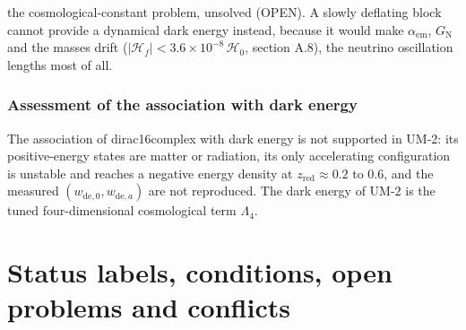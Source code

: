 \documentclass[
  10pt,
]{article}
\begin{document}
the cosmological-constant problem, unsolved (OPEN). A slowly deflating
block cannot provide a dynamical dark energy instead, because it would
make \(\alpha_{\mathrm{em}}\), \(G_{\mathrm{N}}\) and the masses drift
(\(\lvert\mathcal{H}_f\rvert < 3.6\times10^{-8}\,\mathcal{H}_0\),
section A.8), the neutrino oscillation lengths most of all.

\hypertarget{assessment-of-the-association-with-dark-energy}{%
\subsubsection*{Assessment of the association with dark
energy}\label{assessment-of-the-association-with-dark-energy}}

The association of dirac16complex with dark energy is not supported in
UM-2: its positive-energy states are matter or radiation, its only
accelerating configuration is unstable and reaches a negative energy
density at \(z_{\mathrm{red}} \approx 0.2\) to \(0.6\), and the measured
\((w_{\mathrm{de},0}, w_{\mathrm{de},a})\) are not reproduced. The dark
energy of UM-2 is the tuned four-dimensional cosmological term
\(\Lambda_4\).

\hypertarget{status-labels-conditions-open-problems-and-conflicts}{%
\section*{Status labels, conditions, open problems and
conflicts}\label{status-labels-conditions-open-problems-and-conflicts}}
\end{document}
